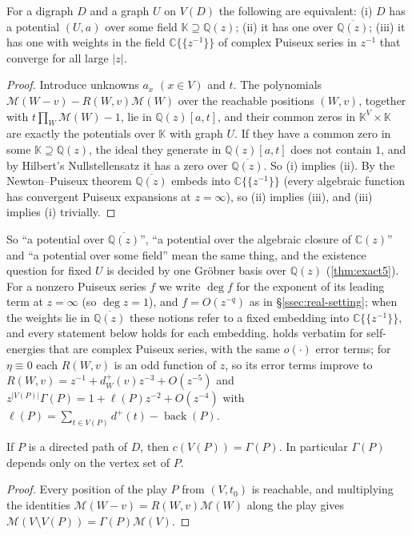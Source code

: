 \documentclass[final]{siamart0516}
\numberwithin{theorem}{section}
\numberwithin{equation}{section}
\theoremstyle{siamnonum}
\theoremstyle{plain}
\newcommand{\QQ}{\mathbb{Q}}
\newcommand{\CC}{\mathbb{C}}
\newcommand{\Qz}{\QQ(z)}
\newcommand{\Qzbar}{\overline{\QQ(z)}}
\newcommand{\Mpot}{\mathcal{M}}           %
\newcommand{\back}{\operatorname{back}}
\begin{document}
\begin{lemma}\label{lem:field-independence}
For a digraph $D$ and a graph $U$ on $V(D)$ the following are equivalent: \textup{(i)} $D$ has a potential $(U,a)$ over some field $\mathbb K\supseteq\Qz$; \textup{(ii)} it has one over $\Qzbar$; \textup{(iii)} it has one with weights in the field $\CC\{\!\{z^{-1}\}\!\}$ of complex Puiseux series in $z^{-1}$ that converge for all large $|z|$.
\end{lemma}
\begin{proof}
Introduce unknowns $a_x$ $(x\in V)$ and $t$. The polynomials $\Mpot(W-v)-R(W,v)\Mpot(W)$ over the reachable positions $(W,v)$, together with $t\prod_W\Mpot(W)-1$, lie in $\Qz[a,t]$, and their common zeros in $\mathbb K^{V}\times\mathbb K$ are exactly the potentials over $\mathbb K$ with graph $U$. If they have a common zero in some $\mathbb K\supseteq\Qz$, the ideal they generate in $\Qz[a,t]$ does not contain $1$, and by Hilbert's Nullstellensatz it has a zero over $\Qzbar$. So (i) implies (ii). By the Newton--Puiseux theorem $\Qzbar$ embeds into $\CC\{\!\{z^{-1}\}\!\}$ (every algebraic function has convergent Puiseux expansions at $z=\infty$), so (ii) implies (iii), and (iii) implies (i) trivially.
\end{proof}

So ``a potential over $\Qzbar$'', ``a potential over the algebraic closure of $\CC(z)$'' and ``a potential over some field'' mean the same thing, and the existence question for fixed $U$ is decided by one Gr\"obner basis over $\Qz$ (\cref{thm:exact5}). For a nonzero Puiseux series $f$ we write $\deg f$ for the exponent of its leading term at $z=\infty$ (so $\deg z=1$), and $f=O(z^{-q})$ as in \S\ref{ssec:real-setting}; when the weights lie in $\Qzbar$ these notions refer to a fixed embedding into $\CC\{\!\{z^{-1}\}\!\}$, and every statement below holds for each embedding.  holds verbatim for self-energies that are complex Puiseux series, with the same $o(\cdot)$ error terms; for $\eta\equiv0$ each $R(W,v)$ is an odd function of $z$, so its error terms improve to $R(W,v)=z^{-1}+d^{+}_W(v)z^{-3}+O(z^{-5})$ and $z^{|V(P)|}\Gamma(P)=1+\ell(P)z^{-2}+O(z^{-4})$ with $\ell(P)=\sum_{t\in V(P)}d^{+}(t)-\back(P)$.

\begin{lemma}[telescoping]\label{lem:telescoping}
If $P$ is a directed path of $D$, then $c(V(P))=\Gamma(P)$. In particular $\Gamma(P)$ depends only on the vertex set of $P$.
\end{lemma}
\begin{proof}
Every position of the play $P$ from $(V,t_0)$ is reachable, and multiplying the identities $\Mpot(W-v)=R(W,v)\Mpot(W)$ along the play gives $\Mpot(V\setminus V(P))=\Gamma(P)\Mpot(V)$.
\end{proof}
\end{document}
